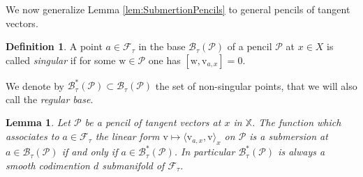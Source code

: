 \documentclass[reqno,10pt]{amsart}
\theoremstyle{plain}
\newtheorem{lem}[thm]{Lemma}
\theoremstyle{definition}
\newtheorem{defn}[thm]{Definition}
\theoremstyle{remark}
\newcommand{\type}{\tau}
\newcommand{\X}{\mathbb{X}}
\begin{document}
We now generalize Lemma \ref{lem:SubmertionPencils} to general pencils of tangent vectors. 

\begin{defn}
A point $a\in \mathcal{F}_\type$ in the base $\mathcal{B}_\type(\mathcal{P})$ of a pencil $\mathcal{P}$ at $x\in X$ is called \emph{singular} if for some $\mathrm{w}\in \mathcal{P}$ one has $[\mathrm{w},\mathrm{v}_{a,x}]=0$.

\medskip

We denote by $\mathcal{B}^*_\type(\mathcal{P})\subset \mathcal{B}_\type(\mathcal{P})$ the set of non-singular points, that we will also call the \emph{regular base}.
\end{defn}

\begin{lem}
\label{lem:SmoothSymmetricPencils}
Let $\mathcal{P}$ be a pencil of tangent vectors at $x$ in $\X$. The function which associates to $a\in \mathcal{F}_\type$ the linear form $\mathrm{v} \mapsto \langle \mathrm{v}_{a,x},\mathrm{v} \rangle_x$ on $\mathcal{P}$ is a submersion at $a\in \mathcal{B}_\type(\mathcal{P})$ if and only if $a\in \mathcal{B}^*_\type(\mathcal{P})$. In particular $\mathcal{B}^*_\type(\mathcal{P})$ is always a smooth codimention $d$ submanifold of $\mathcal{F}_\type$.

\end{lem}
\end{document}
